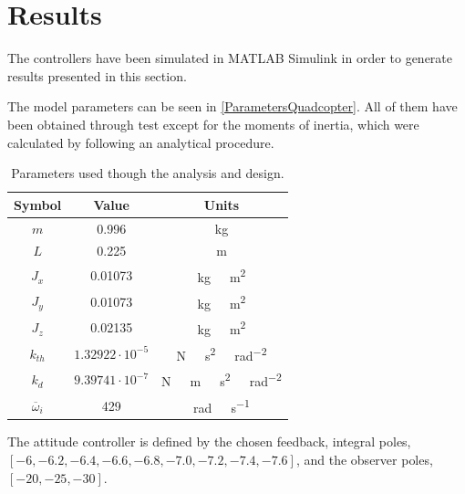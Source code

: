 \section{Results}

The controllers have been simulated in MATLAB Simulink in order to generate results presented in this section. 

The model parameters can be seen in \autoref{ParametersQuadcopter}. All of them have been obtained through test except for the moments of inertia, which were calculated by following an analytical procedure.

\begin{table}[H]
    \centering
    \begin{tabular}{c|c|c}
        \textbf{Symbol} &\textbf{Value} &\textbf{Units}\\
        \hline %
        $m$ & 0.996       &kg\\
        \hline %
        $L$  &   0.225       & m\\
        \hline %
        $J_x$  & 0.01073       & \si{kg \  m^2}\\
        \hline %
        $J_y$  & 0.01073       & \si{kg \  m^2}\\
        \hline %
        $J_z$  & 0.02135       & \si{kg \  m^2}\\
        \hline %
        $k_{th}$  & $1.32922\cdot10^{-5}$       & \si{N \  s^2 \  rad^{-2}}\\
        \hline %
        $k_{d}$  & $9.39741 \cdot10^{-7}$       & \si{N \  m \  s^2 \  rad^{-2}}\\
        \hline %
        $\overline{\omega}_i$& 429      & \si{rad \ s^{-1}}\\
        
    \end{tabular}
    \caption{Parameters used though the analysis and design.}
    \label{ParametersQuadcopter}
\end{table}
The attitude controller is defined by the chosen feedback, integral poles, $[-6, -6.2, -6.4, -6.6, -6.8, -7.0, -7.2, -7.4, -7.6]$, and  the observer poles, $[-20, -25, -30]$.

